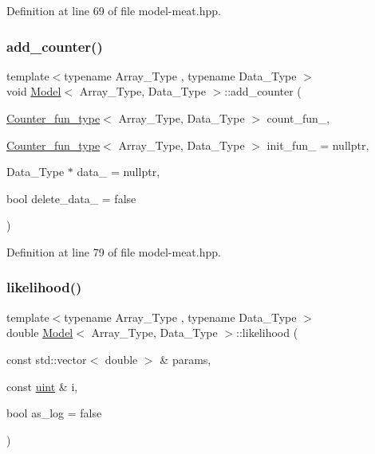 Definition at line 69 of file model-\/meat.\+hpp.

\mbox{\label{class_model_a950b0429e07047d4774eac60f7c335f2}} 
\subsubsection{\texorpdfstring{add\+\_\+counter()}{add\_counter()}\hspace{0.1cm}{\footnotesize\ttfamily [3/3]}}
{\footnotesize\ttfamily template$<$typename Array\+\_\+\+Type , typename Data\+\_\+\+Type $>$ \\
void \hyperlink{class_model}{Model}$<$ Array\+\_\+\+Type, Data\+\_\+\+Type $>$\+::add\+\_\+counter (\begin{DoxyParamCaption}\item[{\hyperlink{typedefs_8hpp_ac0160f52f564dea3ac033b374cffbfe7}{Counter\+\_\+fun\+\_\+type}$<$ Array\+\_\+\+Type, Data\+\_\+\+Type $>$}]{count\+\_\+fun\+\_\+,  }\item[{\hyperlink{typedefs_8hpp_ac0160f52f564dea3ac033b374cffbfe7}{Counter\+\_\+fun\+\_\+type}$<$ Array\+\_\+\+Type, Data\+\_\+\+Type $>$}]{init\+\_\+fun\+\_\+ = {\ttfamily nullptr},  }\item[{Data\+\_\+\+Type $\ast$}]{data\+\_\+ = {\ttfamily nullptr},  }\item[{bool}]{delete\+\_\+data\+\_\+ = {\ttfamily false} }\end{DoxyParamCaption})\hspace{0.3cm}{\ttfamily [inline]}}



Definition at line 79 of file model-\/meat.\+hpp.

\mbox{\label{class_model_abc2f255c6b6c4dd0ff3680aab35fd308}} 
\subsubsection{\texorpdfstring{likelihood()}{likelihood()}\hspace{0.1cm}{\footnotesize\ttfamily [1/2]}}
{\footnotesize\ttfamily template$<$typename Array\+\_\+\+Type , typename Data\+\_\+\+Type $>$ \\
double \hyperlink{class_model}{Model}$<$ Array\+\_\+\+Type, Data\+\_\+\+Type $>$\+::likelihood (\begin{DoxyParamCaption}\item[{const std\+::vector$<$ double $>$ \&}]{params,  }\item[{const \hyperlink{typedefs_8hpp_a91ad9478d81a7aaf2593e8d9c3d06a14}{uint} \&}]{i,  }\item[{bool}]{as\+\_\+log = {\ttfamily false} }\end{DoxyParamCaption})\hspace{0.3cm}{\ttfamily [inline]}}



